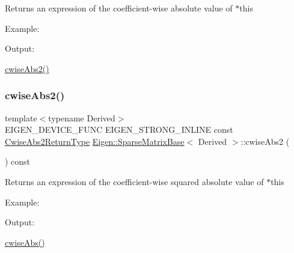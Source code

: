 \begin{DoxyReturn}{Returns}
an expression of the coefficient-\/wise absolute value of {\ttfamily $\ast$this} 
\end{DoxyReturn}
Example\+: 
\begin{DoxyCodeInclude}{0}
\end{DoxyCodeInclude}
 Output\+: 
\begin{DoxyVerbInclude}
\end{DoxyVerbInclude}
 \mbox{\hyperlink{class_eigen_1_1_sparse_matrix_base_a2052c2ae010743f6b76a8da5912350b4}{cwise\+Abs2()}} \mbox{\label{class_eigen_1_1_sparse_matrix_base_a2052c2ae010743f6b76a8da5912350b4}} 
\subsubsection{\texorpdfstring{cwiseAbs2()}{cwiseAbs2()}}
{\footnotesize\ttfamily template$<$typename Derived$>$ \\
E\+I\+G\+E\+N\+\_\+\+D\+E\+V\+I\+C\+E\+\_\+\+F\+U\+NC E\+I\+G\+E\+N\+\_\+\+S\+T\+R\+O\+N\+G\+\_\+\+I\+N\+L\+I\+NE const \mbox{\hyperlink{class_eigen_1_1_cwise_unary_op}{Cwise\+Abs2\+Return\+Type}} \mbox{\hyperlink{class_eigen_1_1_sparse_matrix_base}{Eigen\+::\+Sparse\+Matrix\+Base}}$<$ Derived $>$\+::cwise\+Abs2 (\begin{DoxyParamCaption}{ }\end{DoxyParamCaption}) const\hspace{0.3cm}{\ttfamily [inline]}}

\begin{DoxyReturn}{Returns}
an expression of the coefficient-\/wise squared absolute value of {\ttfamily $\ast$this} 
\end{DoxyReturn}
Example\+: 
\begin{DoxyCodeInclude}{0}
\end{DoxyCodeInclude}
 Output\+: 
\begin{DoxyVerbInclude}
\end{DoxyVerbInclude}
 \mbox{\hyperlink{class_eigen_1_1_sparse_matrix_base_ae8e39ef24c78084bdaddddad8488e11b}{cwise\+Abs()}} \mbox{\label{class_eigen_1_1_sparse_matrix_base_aa55947922b1a537dbcfa857b48625a58}} 
